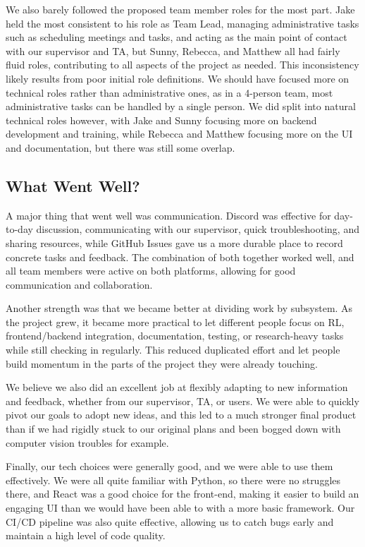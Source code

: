 \documentclass{article}
\begin{document}
We also barely followed the proposed team member roles for the most part.
Jake held the most consistent to his role as Team Lead, managing administrative tasks such as scheduling meetings
and tasks, and acting as the main point of contact with our supervisor and TA, but Sunny, Rebecca, and Matthew
all had fairly fluid roles, contributing to all aspects of the project as needed.
This inconsistency likely results from poor initial role definitions.
We should have focused more on technical roles rather than administrative ones, as in a 4-person team,
most administrative tasks can be handled by a single person.
We did split into natural technical roles however, with Jake and Sunny focusing more on backend development
and training, while Rebecca and Matthew focusing more on the UI and documentation, but there was still some overlap.


\subsection{What Went Well?}


A major thing that went well was communication.
Discord was effective for day-to-day discussion, communicating with our supervisor, quick troubleshooting,
and sharing resources, while GitHub Issues gave us a more durable place to record concrete tasks and feedback.
The combination of both together worked well, and all team members were active on both platforms, allowing
for good communication and collaboration.

Another strength was that we became better at dividing work by subsystem.
As the project grew, it became more practical to let different people focus on RL, frontend/backend integration,
documentation, testing, or research-heavy tasks while still checking in regularly.
This reduced duplicated effort and let people build momentum in the parts of the project they were already touching.

We believe we also did an excellent job at flexibly adapting to new information and feedback, whether from
our supervisor, TA, or users.
We were able to quickly pivot our goals to adopt new ideas, and this led to a much stronger final product
than if we had rigidly stuck to our original plans and been bogged down with computer vision troubles for example.

Finally, our tech choices were generally good, and we were able to use them effectively.
We were all quite familiar with Python, so there were no struggles there, and React was a good choice for
the front-end, making it easier to build an engaging UI than we would have been able to
with a more basic framework.
Our CI/CD pipeline was also quite effective, allowing us to catch bugs early and maintain
a high level of code quality.
\end{document}
